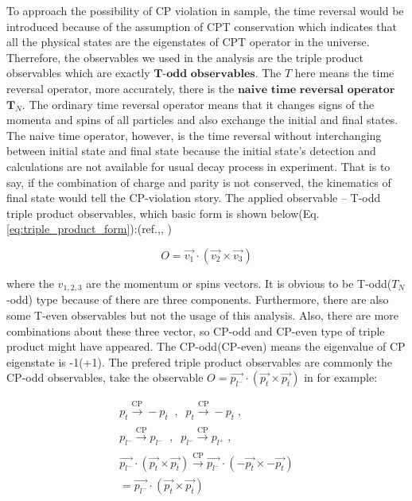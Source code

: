 	To approach the possibility of CP violation in sample, the time reversal would be introduced because of the assumption of CPT conservation which indicates that all the physical states are the eigenstates of CPT operator in the universe. Therrefore, the observables we used in the analysis are the triple product observables which are exactly $\textbf{T-odd observables}$. The $T$ here means the time reversal operator, more accurately, there is the $\textbf{naive time reversal operator}$ $\textbf{T}_N$. The ordinary time reversal operator means that it changes signs of the momenta and spins of all particles and also exchange the initial and final states. The naive time operator, however, is the time reversal without interchanging between initial state and final state because the initial state's detection and calculations are not available for usual decay process in experiment. That is to say, if the combination of charge and parity is not conserved, the kinematics of final state would tell the CP-violation story. The applied observable -- T-odd triple product observables, which basic form is shown below(Eq.\ref{eq:triple_product_form}):(ref.\cite{PhysRevLett.58.451},\cite{PhysRevD.80.034013}, )

	\begin{equation}
	O = \vec{v_{1}} \cdot ( \vec{v_2} \times \vec{v_{3}} )
	\label{eq:triple_product_form}
	\end{equation}

	where the $v_{1,2,3}$ are the momentum or spins vectors. It is obvious to be T-odd($T_{N}$-odd) type because of there are three components. Furthermore, there are also some T-even observables but not the usage of this analysis. Also, there are more combinations about these three vector, so CP-odd and CP-even type of triple product might have appeared. The CP-odd(CP-even) means the eigenvalue of CP eigenstate is -1(+1). The prefered triple product observables are commonly the CP-odd observables, take the observable $O = \vec{p_{l^-}} \cdot ( \vec{p_{t}} \times \vec{p_{\bar{t}}} )$ in \cite{PhysRevLett.58.451} for example:

	\begin{equation}
	\begin{split}
	p_{t}\xrightarrow[\text{}]{\text{CP}} -p_{\bar{t}} \; \; , \; \; p_{t}\xrightarrow[\text{}]{\text{CP}} -p_{\bar{t}} \; , \; \; \\
	p_{l^-} \xrightarrow[\text{}]{\text{CP}} p_{l^-} \; \; , \; \; p_{l^-} \xrightarrow[\text{}]{\text{CP}} p_{l^+} \;, \\
	\vec{p_{l^-}} \cdot ( \vec{p_{t}} \times \vec{p_{\overline{t}}} ) \xrightarrow[]{\text{CP}} \vec{p_{l^-}} \cdot ( - \vec{p_{\overline{t}}} \times - \vec{p_{t}} ) \\
	= \vec{p_{l^-}} \cdot ( \vec{p_{t}} \times \vec{p_{\overline{t}}} ) \;\;\;\;\;\;
	\end{split}
	\label{eq:ex_obs_eett}
	\end{equation}

